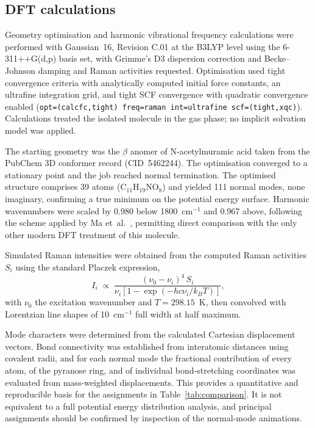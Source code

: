 \documentclass[preprint,12pt]{elsarticle}
\newcommand{\wn}{\ensuremath{\mathrm{cm}^{-1}}}
\begin{document}
\subsection{DFT calculations}

Geometry optimisation and harmonic vibrational frequency calculations were
performed with Gaussian~16, Revision C.01 \cite{gaussian16} at the B3LYP level
\cite{becke1993,lee1988} using the 6-311++G(d,p) basis set, with Grimme's D3
dispersion correction and Becke--Johnson damping \cite{grimme2011} and Raman
activities requested. Optimisation used tight convergence criteria with
analytically computed initial force constants, an ultrafine integration grid,
and tight SCF convergence with quadratic convergence enabled
(\texttt{opt=(calcfc,tight) freq=raman int=ultrafine scf=(tight,xqc)}).
Calculations treated the isolated molecule in the gas phase; no implicit
solvation model was applied.

The starting geometry was the $\beta$ anomer of N-acetylmuramic acid taken from
the PubChem 3D conformer record (CID~5462244). The optimisation converged to a
stationary point and the job reached normal termination. The optimised structure
comprises 39 atoms (C$_{11}$H$_{19}$NO$_8$) and yielded 111 normal modes, none
imaginary, confirming a true minimum on the potential energy surface. Harmonic
wavenumbers were scaled by 0.980 below 1800~\wn{} and 0.967 above, following the
scheme applied by Ma et~al.\ \cite{ma2024ecoli}, permitting direct comparison
with the only other modern DFT treatment of this molecule.

Simulated Raman intensities were obtained from the computed Raman activities
$S_i$ using the standard Placzek expression,
\begin{equation}
I_i \;\propto\; \frac{(\nu_0-\nu_i)^4\,S_i}
{\nu_i\left[1-\exp\!\left(-hc\nu_i/k_BT\right)\right]},
\end{equation}
with $\nu_0$ the excitation wavenumber and $T = 298.15$~K, then convolved with
Lorentzian line shapes of 10~\wn{} full width at half maximum.

Mode characters were determined from the calculated Cartesian displacement
vectors. Bond connectivity was established from interatomic distances using
covalent radii, and for each normal mode the fractional contribution of every
atom, of the pyranose ring, and of individual bond-stretching coordinates was
evaluated from mass-weighted displacements. This provides a quantitative and
reproducible basis for the assignments in Table~\ref{tab:comparison}. It is not
equivalent to a full potential energy distribution analysis, and principal
assignments should be confirmed by inspection of the normal-mode animations.
\end{document}

